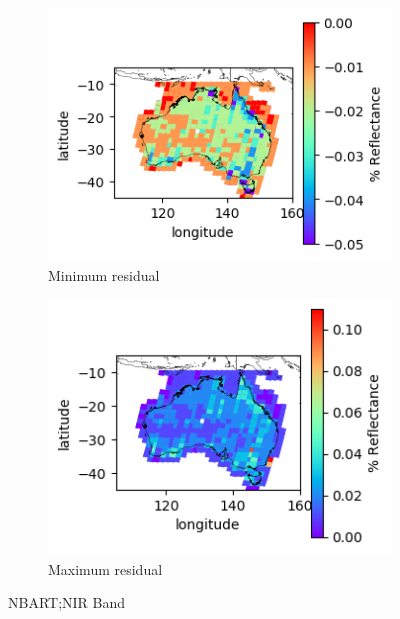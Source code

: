 \documentclass[a4paper]{article}
\begin{document}
      \begin{figure}[h!]
        \centering
          \begin{subfigure}[l]{.4\linewidth}
            \hspace{-32mm}
            \includegraphics[scale=0.9]{plots/nbart/nbart_nir-MinResidual.png}
            \caption{Minimum residual}
          \end{subfigure}
%
          \begin{subfigure}[r]{.4\linewidth}
            \includegraphics[scale=0.9]{plots/nbart/nbart_nir-MaxResidual.png}
            \caption{Maximum residual}
          \end{subfigure}
        \caption{NBART;\@ NIR Band}\label{figure:9}
      \end{figure}
\end{document}
